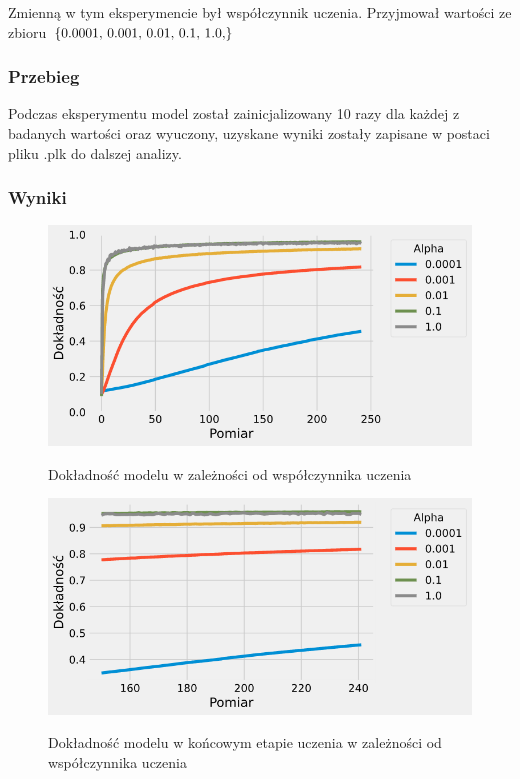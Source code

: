 \documentclass{article}
\begin{document}
Zmienną w tym eksperymencie był współczynnik uczenia. Przyjmował wartości ze zbioru \(\{$0.0001, 0.001, 0.01, 0.1, 1.0,$\}\)
\subsubsection*{Przebieg}

Podczas eksperymentu model został zainicjalizowany 10 razy dla każdej z badanych wartości oraz wyuczony, uzyskane wyniki zostały zapisane w postaci pliku .plk do dalszej analizy.

\subsubsection*{Wyniki}
\begin{figure}[H]
	\centering
	\caption{Dokładność modelu w zależności od współczynnika uczenia}
	\includegraphics[width=\textwidth]{alpha_acc.png}
	\label{fig:res41}
\end{figure}
\begin{figure}[H]
	\centering
	\caption{Dokładność modelu w końcowym etapie uczenia w zależności od współczynnika uczenia}
	\includegraphics[width=\textwidth]{alpha_acc_zoom.png}
	\label{fig:res42}
\end{figure}
\end{document}
